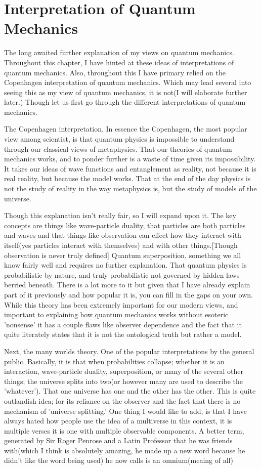 \section{Interpretation of Quantum Mechanics}
\par The long awaited further explanation of my views on quantum mechanics. Throughout this chapter, I have hinted at these ideas of interpretations of quantum mechanics. Also, throughout this I have primary relied on the Copenhagen interpretation of quantum mechanics. Which may lead several into seeing this as my view of quantum mechanics, it is not(I will elaborate further later.) Though let us first go through the different interpretations of quantum mechanics.
\par The Copenhagen interpretation. In essence the Copenhagen, the most popular view among scientist, is  that quantum physics is impossible to understand through our classical views of metaphysics. That our theories of quantum mechanics works, and to ponder further is a waste of time given its impossibility. It takes our ideas of wave functions and entanglement as reality, not because it is real reality, but because the model works. That at the end of the day physics is not the study of reality in the way metaphysics is, but the study of models of the universe. 
\par Though this explanation isn't really fair, so I will expand upon it. The key concepts are things like wave-particle duality, that particles are both particles and waves and that things like observation can effect how they interact with itself(yes particles interact with themselves) and with other things.[Though observation is never truly defined] Quantum superposition, something we all know fairly well and requires no further explanation. That quantum physics is probabilistic by nature, and truly probabilistic not governed by hidden laws berried beneath. There is a lot more to it but given that I have already explain part of it previously and how popular it is, you can fill in the gaps on your own. While this theory has been extremely important for our modern views, and important to explaining how quantum mechanics works without esoteric 'nonsense' it has a couple flaws like observer dependence and the fact that it quite literately states that it is not the ontological truth but rather a model.
\par Next, the many worlds theory. One of the popular interpretations by the general public. Basically, it is that when probabilities collapse; whether it is an interaction, wave-particle duality, superposition, or many of the several other things; the universe splits into two(or however many are used to describe the 'whatever'). That one universe has one and the other has the other. This is quite outlandish idea; for its reliance on the observer and the fact that there is no mechanism of 'universe splitting.' One thing I would like to add, is that I have always hated how people use the idea of a multiverse in this context, it is multiple verses it is one with multiple observable components. A better term, generated by Sir Roger Penrose and a Latin Professor that he was friends with(which I think is absolutely amazing, he made up a new word because he didn't like the word being used) he now calls is an omnium(meaing of all)
